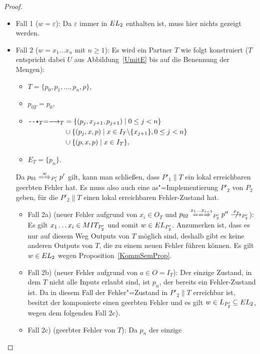 \begin{proof}
  \begin{itemize}
    \item Fall 1 ($w=\varepsilon$): Da $\varepsilon$ immer in $EL _2$
      enthalten ist, muss hier nichts gezeigt werden.
    \item Fall 2 ($w=x_1\dots x_n$ mit $n\geq 1$): Es wird ein Partner $T$ wie
      folgt konstruiert ($T$ entspricht dabei $U$ aus Abbildung~\ref{UmitE} bis
      auf die Benennung der Mengen):
      \begin{itemize}
        \item $T=\{p_0,p_1,\dots ,p_n,p\}$,
        \item $p_{0T}=p_0$,
        \item $\begin{aligned}[t]
            \may _T = \must _T&=\{(p_j,x_{j+1},p_{j+1})\mid 0\leq j< n\}\\
            &\cup\{(p_j,x,p)\mid x\in I_T\backslash\{x_{j+1}\},0\leq j< n\}\\
            &\cup\{(p,x,p)\mid x\in I_T\},
        \end{aligned}$
        \item $E_T=\{p_n\}$.
      \end{itemize}
      Da $p_{01} \weakmay[w]_{P'_1} p'$ gilt, kann man schließen, dass
      $P'_1\|T$ ein lokal erreichbaren geerbten Fehler hat. Es muss also auch
      eine as"=Implementierung $P'_2$ von $P_2$ geben, für die $P'_2\|T$ einen
      lokal erreichbaren Fehler-Zustand hat.
      \begin{itemize}
        \item Fall 2a) (neuer Fehler aufgrund von $x_i\in O_T$ und $p_{02}
          \lweakmay[x_1\dots x_{i-1}]_{P'_2}p''\nmust[x_i]_{P'_2}$): Es gilt
          $x_1\dots x_i\in MIT _{P'_2}$ und somit $w\in EL _{P'_2}$. Anzumerken
          ist, dass es nur auf diesem Weg Outputs von $T$ möglich sind, deshalb
          gibt es keine anderen Outputs von $T$, die zu einem neuen Fehler
          führen können. Es gilt $w\in EL _2$ wegen
          Proposition~\ref{KommSemProp}.
        \item Fall 2b) (neuer Fehler aufgrund von $a\in O=I_T$): Der einzige
          Zustand, in dem $T$ nicht alle Inputs erlaubt sind, ist $p_n$, der
          bereits ein Fehler-Zustand ist. Da in diesem Fall der Fehler"=Zustand
          in $P'_2\|T$ erreichbar ist, besitzt der komponierte \MEIO{} einen
          geerbten Fehler und es gilt $w\in L_{P'_2}\subseteq EL _2$, wegen
          dem folgenden Fall 2c).
        \item Fall 2c) (geerbter Fehler von $T$): Da $p_n$ der einzige

\end{itemize}
\end{itemize}
\end{proof}
